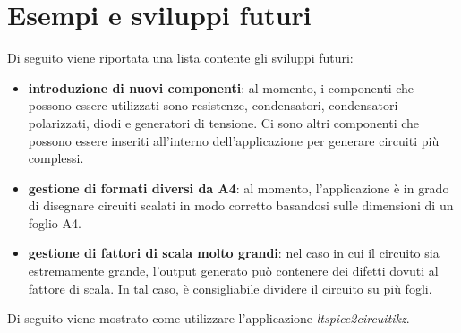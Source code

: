 \section{Esempi e sviluppi futuri}
Di seguito viene riportata una lista contente gli sviluppi futuri:
\begin{itemize}
	\item \textbf{introduzione di nuovi componenti}: al momento, i componenti che possono essere utilizzati sono resistenze, condensatori, condensatori polarizzati, diodi e generatori di tensione. Ci sono altri componenti che possono essere inseriti all'interno dell'applicazione per generare circuiti più complessi.
	\item \textbf{gestione di formati diversi da A4}: al momento, l'applicazione è in grado di disegnare circuiti scalati in modo corretto basandosi sulle dimensioni di un foglio A4. 
	\item \textbf{gestione di fattori di scala molto grandi}: nel caso in cui il circuito sia estremamente grande, l'output generato può contenere dei difetti dovuti al fattore di scala. In tal caso, è consigliabile dividere il circuito su più fogli.
\end{itemize}
Di seguito viene mostrato come utilizzare l'applicazione \textit{ltspice2circuitikz}. 
